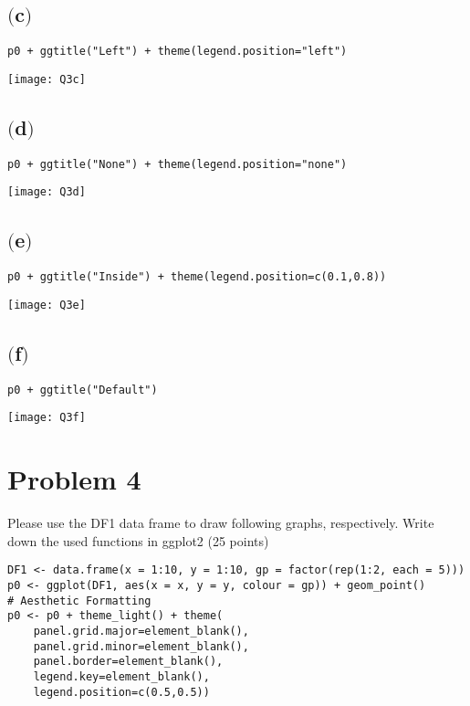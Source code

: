 \documentclass[a4paper,man,natbib]{apa6}
\begin{document}
\pagebreak 

\subsection{$($c$)$}
\begin{verbatim}
p0 + ggtitle("Left") + theme(legend.position="left")
\end{verbatim}
\texttt{[image: Q3c]}

\subsection{$($d$)$}
\begin{verbatim}
p0 + ggtitle("None") + theme(legend.position="none")
\end{verbatim}
\texttt{[image: Q3d]}

\subsection{$($e$)$}
\begin{verbatim}
p0 + ggtitle("Inside") + theme(legend.position=c(0.1,0.8))
\end{verbatim}
\texttt{[image: Q3e]}

\subsection{$($f$)$}
\begin{verbatim}
p0 + ggtitle("Default")
\end{verbatim}
\texttt{[image: Q3f]}

\pagebreak

\section{Problem 4}
Please use the DF1 data frame to draw following graphs, respectively.  Write down the used functions in ggplot2 (25 points)
\begin{verbatim}
DF1 <- data.frame(x = 1:10, y = 1:10, gp = factor(rep(1:2, each = 5)))
p0 <- ggplot(DF1, aes(x = x, y = y, colour = gp)) + geom_point()
# Aesthetic Formatting
p0 <- p0 + theme_light() + theme(
    panel.grid.major=element_blank(), 
    panel.grid.minor=element_blank(), 
    panel.border=element_blank(), 
    legend.key=element_blank(), 
    legend.position=c(0.5,0.5))
\end{verbatim}
\end{document}
